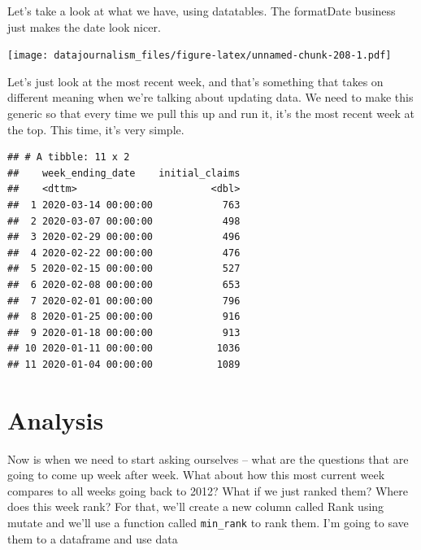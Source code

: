 \documentclass[]{book}
\newenvironment{Shaded}{\begin{snugshade}}{\end{snugshade}}
\newcommand{\DecValTok}[1]{\textcolor[rgb]{0.00,0.00,0.81}{#1}}
\newcommand{\KeywordTok}[1]{\textcolor[rgb]{0.13,0.29,0.53}{\textbf{#1}}}
\newcommand{\NormalTok}[1]{#1}
\newcommand{\OperatorTok}[1]{\textcolor[rgb]{0.81,0.36,0.00}{\textbf{#1}}}
\newcommand{\StringTok}[1]{\textcolor[rgb]{0.31,0.60,0.02}{#1}}
\begin{document}
Let's take a look at what we have, using datatables. The formatDate business just makes the date look nicer.

\begin{Shaded}
\end{Shaded}

\texttt{[image: datajournalism\_files/figure-latex/unnamed-chunk-208-1.pdf]}

Let's just look at the most recent week, and that's something that takes on different meaning when we're talking about updating data. We need to make this generic so that every time we pull this up and run it, it's the most recent week at the top. This time, it's very simple.

\begin{Shaded}
\end{Shaded}

\begin{verbatim}
## # A tibble: 11 x 2
##    week_ending_date    initial_claims
##    <dttm>                       <dbl>
##  1 2020-03-14 00:00:00            763
##  2 2020-03-07 00:00:00            498
##  3 2020-02-29 00:00:00            496
##  4 2020-02-22 00:00:00            476
##  5 2020-02-15 00:00:00            527
##  6 2020-02-08 00:00:00            653
##  7 2020-02-01 00:00:00            796
##  8 2020-01-25 00:00:00            916
##  9 2020-01-18 00:00:00            913
## 10 2020-01-11 00:00:00           1036
## 11 2020-01-04 00:00:00           1089
\end{verbatim}

\hypertarget{analysis}{%
\section{Analysis}\label{analysis}}

Now is when we need to start asking ourselves -- what are the questions that are going to come up week after week. What about how this most current week compares to all weeks going back to 2012? What if we just ranked them? Where does this week rank? For that, we'll create a new column called Rank using mutate and we'll use a function called \texttt{min\_rank} to rank them. I'm going to save them to a dataframe and use data
\end{document}
